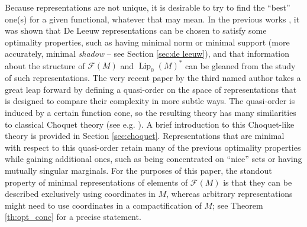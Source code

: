 \documentclass[a4paper,10pt]{amsart}
\DeclareMathOperator{\Lip}{Lip}                             %
\newcommand{\lipfree}[1]{\mathcal{F}({#1})}                 %
\theoremstyle{plain}
\theoremstyle{definition}
\theoremstyle{remark}
\begin{document}
Because representations are not unique, it is desirable to try to find the ``best'' one(s) for a given functional, whatever that may mean. In the previous works \cite{Aliaga,APS1,APS2}, it was shown that De Leeuw representations can be chosen to satisfy some optimality properties, such as having minimal norm or minimal support (more accurately, minimal \emph{shadow} -- see Section \ref{sec:de leeuw}), and that information about the structure of $\lipfree{M}$ and $\Lip_0(M)^*$ can be gleaned from the study of such representations. The very recent paper \cite{Smith24} by the third named author takes a great leap forward by defining a quasi-order on the space of representations that is designed to compare their complexity in more subtle ways. The quasi-order is induced by a certain function cone, so the resulting theory has many similarities to classical Choquet theory (see e.g. \cite[Chapter 3]{lmns10}). A brief introduction to this Choquet-like theory is provided in Section \ref{sec:choquet}. Representations that are minimal with respect to this quasi-order retain many of the previous optimality properties while gaining additional ones, such as being concentrated on ``nice'' sets or having mutually singular marginals. For the purposes of this paper, the standout property of minimal representations of elements of $\lipfree{M}$ is that they can be described exclusively using coordinates in $M$, whereas arbitrary representations might need to use coordinates in a compactification of $M$; see Theorem \ref{th:opt_conc} for a precise statement.
\end{document}

